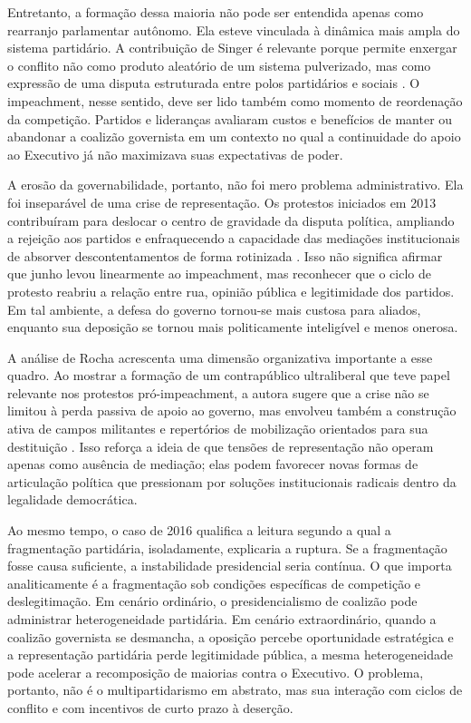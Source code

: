 \documentclass[12pt,a4paper]{article}
\begin{document}
Entretanto, a formação dessa maioria não pode ser entendida apenas como rearranjo parlamentar autônomo. Ela esteve vinculada à dinâmica mais ampla do sistema partidário. A contribuição de Singer é relevante porque permite enxergar o conflito não como produto aleatório de um sistema pulverizado, mas como expressão de uma disputa estruturada entre polos partidários e sociais \textcite{singersd_tres_partidos}. O impeachment, nesse sentido, deve ser lido também como momento de reordenação da competição. Partidos e lideranças avaliaram custos e benefícios de manter ou abandonar a coalizão governista em um contexto no qual a continuidade do apoio ao Executivo já não maximizava suas expectativas de poder.

A erosão da governabilidade, portanto, não foi mero problema administrativo. Ela foi inseparável de uma crise de representação. Os protestos iniciados em 2013 contribuíram para deslocar o centro de gravidade da disputa política, ampliando a rejeição aos partidos e enfraquecendo a capacidade das mediações institucionais de absorver descontentamentos de forma rotinizada \textcite{alonso2016_changing_repertoires}. Isso não significa afirmar que junho levou linearmente ao impeachment, mas reconhecer que o ciclo de protesto reabriu a relação entre rua, opinião pública e legitimidade dos partidos. Em tal ambiente, a defesa do governo tornou-se mais custosa para aliados, enquanto sua deposição se tornou mais politicamente inteligível e menos onerosa.

A análise de Rocha acrescenta uma dimensão organizativa importante a esse quadro. Ao mostrar a formação de um contrapúblico ultraliberal que teve papel relevante nos protestos pró-impeachment, a autora sugere que a crise não se limitou à perda passiva de apoio ao governo, mas envolveu também a construção ativa de campos militantes e repertórios de mobilização orientados para sua destituição \textcite{rocha2019_imposto_e}. Isso reforça a ideia de que tensões de representação não operam apenas como ausência de mediação; elas podem favorecer novas formas de articulação política que pressionam por soluções institucionais radicais dentro da legalidade democrática.

Ao mesmo tempo, o caso de 2016 qualifica a leitura segundo a qual a fragmentação partidária, isoladamente, explicaria a ruptura. Se a fragmentação fosse causa suficiente, a instabilidade presidencial seria contínua. O que importa analiticamente é a fragmentação sob condições específicas de competição e deslegitimação. Em cenário ordinário, o presidencialismo de coalizão pode administrar heterogeneidade partidária. Em cenário extraordinário, quando a coalizão governista se desmancha, a oposição percebe oportunidade estratégica e a representação partidária perde legitimidade pública, a mesma heterogeneidade pode acelerar a recomposição de maiorias contra o Executivo. O problema, portanto, não é o multipartidarismo em abstrato, mas sua interação com ciclos de conflito e com incentivos de curto prazo à deserção.
\end{document}
